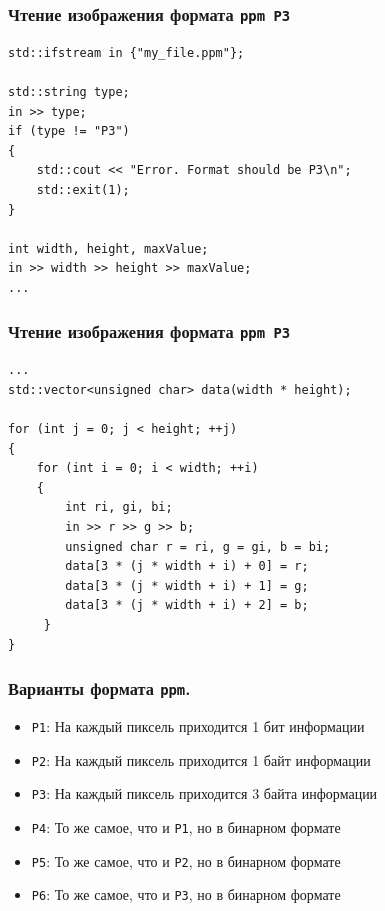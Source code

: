 \documentclass[10pt,pdf,hyperref={unicode}]{beamer}
\begin{document}
\begin{frame}[fragile]
\frametitle{Чтение изображения формата \texttt{ppm P3} } 
\begin{lstlisting}
std::ifstream in {"my_file.ppm"};

std::string type;
in >> type;
if (type != "P3")
{
    std::cout << "Error. Format should be P3\n";
    std::exit(1);
}

int width, height, maxValue; 
in >> width >> height >> maxValue;
...
\end{lstlisting}
\end{frame}

\begin{frame}[fragile]
\frametitle{Чтение изображения формата \texttt{ppm P3} } 
\begin{lstlisting}
...
std::vector<unsigned char> data(width * height);

for (int j = 0; j < height; ++j) 
{
    for (int i = 0; i < width; ++i) 
    {
        int ri, gi, bi;
        in >> r >> g >> b;
        unsigned char r = ri, g = gi, b = bi;
        data[3 * (j * width + i) + 0] = r;
        data[3 * (j * width + i) + 1] = g;
        data[3 * (j * width + i) + 2] = b;
     }
}
\end{lstlisting}
\end{frame}


\begin{frame}[fragile]
\frametitle{Варианты формата \texttt{ppm}.} 
\begin{itemize}
\item \texttt{P1}: На каждый пиксель приходится 1 бит   информации
\item \texttt{P2}: На каждый пиксель приходится 1 байт  информации
\item \texttt{P3}: На каждый пиксель приходится 3 байта информации
\item \texttt{P4}: То же самое, что и \texttt{P1}, но в бинарном формате
\item \texttt{P5}: То же самое, что и \texttt{P2}, но в бинарном формате
\item \texttt{P6}: То же самое, что и \texttt{P3}, но в бинарном формате
\end{itemize}
\end{frame}
\end{document}
